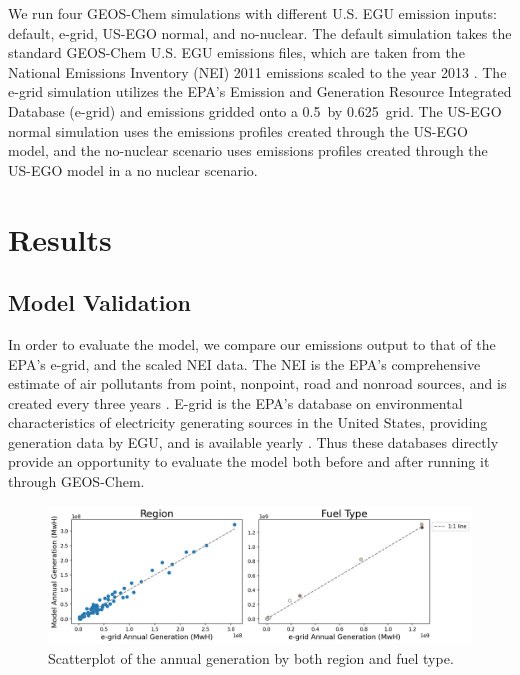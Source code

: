 \documentclass[12]{article}
\begin{document}
We run four GEOS-Chem simulations with different U.S. EGU emission inputs: default, e-grid, US-EGO normal, and no-nuclear. The default simulation takes the standard GEOS-Chem U.S. EGU emissions files, which are taken from the National Emissions Inventory (NEI) 2011 emissions scaled to the year 2013 \citep{geos-chem_epanei11_2019}. The e-grid simulation utilizes the EPA's Emission and Generation Resource Integrated Database (e-grid) \citep{epa_emissions_2016}  and  emissions gridded onto a 0.5\textdegree~by 0.625\textdegree~grid. The US-EGO normal simulation uses the emissions profiles created through the US-EGO model, and the no-nuclear scenario uses emissions profiles created through the US-EGO model in a no nuclear scenario. 

\section{Results}
\subsection{Model Validation}

In order to evaluate the model, we compare our emissions output to that of the EPA's e-grid, and the scaled NEI data. The NEI is the EPA's comprehensive estimate of air pollutants from point, nonpoint, road and nonroad sources, and is created every three years \citep{us_epa_national_2015}. E-grid is the EPA's database on environmental characteristics of electricity generating sources in the United States, providing generation data by EGU, and is available yearly \citep{us_epa_emissions_2015}. Thus these databases directly provide an opportunity to evaluate the model both before and after running it through GEOS-Chem.

\begin{figure}[h!]
    \centering
    \includegraphics[width=1.\textwidth]{ego_nonuclear_project/Figures/egrid_model.png}
    \caption{Scatterplot of the annual generation by both region and fuel type.} 
    \label{fig:emissions_region}
\end{figure}
\end{document}
